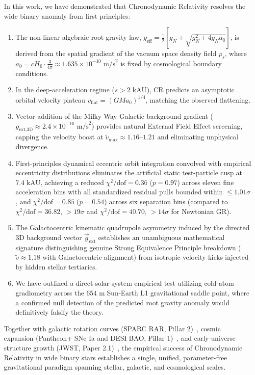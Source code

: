 \documentclass[aps,prd,reprint,superscriptaddress,nofootinbib,floatfix,amsmath,amssymb]{revtex4-2}
\begin{document}
In this work, we have demonstrated that Chronodynamic Relativity resolves the wide binary anomaly from first principles:
\begin{enumerate}
\item The non-linear algebraic root gravity law, $g_{\text{eff}} = \frac{1}{2}\left[g_N + \sqrt{g_N^2 + 4 g_N a_0}\right]$, is derived from the spatial gradient of the vacuum space density field $\rho_s$, where $a_0 = c H_0 \cdot \frac{3}{4\pi} \approx 1.635 \times 10^{-10}\text{ m/s}^2$ is fixed by cosmological boundary conditions.
\item In the deep-acceleration regime ($s > 2\text{ kAU}$), CR predicts an asymptotic orbital velocity plateau $v_{\text{flat}} = (G M a_0)^{1/4}$, matching the observed flattening.
\item Vector addition of the Milky Way Galactic background gradient ($g_{\text{ext,3D}} \approx 2.4 \times 10^{-10}\text{ m/s}^2$) provides natural External Field Effect screening, capping the velocity boost at $\tilde{v}_{\text{max}} \approx 1.16\text{--}1.21$ and eliminating unphysical divergence.
\item First-principles dynamical eccentric orbit integration convolved with empirical eccentricity distributions eliminates the artificial static test-particle cusp at $7.4\text{ kAU}$, achieving a reduced $\chi^2/\text{dof} = 0.36$ ($p = 0.97$) across eleven fine acceleration bins with all standardized residual pulls bounded within $\le 1.01\sigma$, and $\chi^2/\text{dof} = 0.85$ ($p = 0.54$) across six separation bins (compared to $\chi^2/\text{dof} = 36.82$, $>19\sigma$ and $\chi^2/\text{dof} = 40.70$, $>14\sigma$ for Newtonian GR).
\item The Galactocentric kinematic quadrupole asymmetry induced by the directed 3D background vector $\vec{g}_{\text{ext}}$ establishes an unambiguous mathematical signature distinguishing genuine Strong Equivalence Principle breakdown ($\tilde{v} \approx 1.18$ with Galactocentric alignment) from isotropic velocity kicks injected by hidden stellar tertiaries.
\item We have outlined a direct solar-system empirical test utilizing cold-atom gradiometry across the $654\text{ m}$ Sun-Earth L1 gravitational saddle point, where a confirmed null detection of the predicted root gravity anomaly would definitively falsify the theory.
\end{enumerate}

Together with galactic rotation curves (SPARC RAR, Pillar 2)~\cite{shreve2026foundations}, cosmic expansion (Pantheon+ SNe Ia and DESI BAO, Pillar 1)~\cite{shreve2026hubble}, and early-universe structure growth (JWST, Paper 2.1)~\cite{shreve2026jwst}, the empirical success of Chronodynamic Relativity in wide binary stars establishes a single, unified, parameter-free gravitational paradigm spanning stellar, galactic, and cosmological scales.
\end{document}
